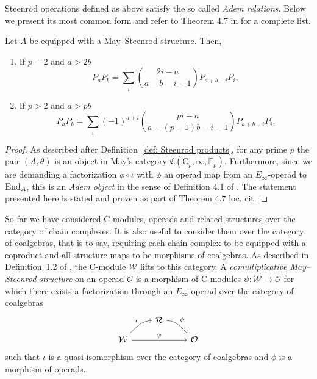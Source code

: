Steenrod operations defined as above satisfy the so called \textit{Adem relations}.
Below we present its most common form and refer to Theorem 4.7 in \cite{may70generalapproach} for a complete list.

\begin{lemma}
	Let $A$ be equipped with a May--Steenrod structure.
	Then,
	\begin{enumerate}
		\item If $p = 2$ and $a > 2b$
		\begin{equation*}
		P_{a}P_{b} = \sum_i {2i-a \choose a-b-i-1} P_{a+b-i}P_i,
		\end{equation*}
		\item If $p > 2$ and $a > pb$
		\begin{equation*}
		P_{a}P_{b} = \sum_i (-1)^{a+i}{pi-a \choose a-(p-1)b-i-1} P_{a+b-i}P_i.
		\end{equation*}
	\end{enumerate}		
\end{lemma}

\begin{proof}
	As described after Definition~\ref{def: Steenrod products}, for any prime $p$ the pair $(A, \theta)$ is an object in May's category $\mathfrak{C}(\mathrm C_p, \infty, \mathbb{F}_p)$.
	Furthermore, since we are demanding a factorization $\phi \circ \iota$ with $\phi$ an operad map from an $E_\infty$-operad to $\mathrm{End}_A$, this is an \textit{Adem object} in the sense of Definition 4.1 of \cite{may70generalapproach}.
	The statement presented here is stated and proven as part of Theorem 4.7 loc. cit.
\end{proof}

So far we have considered $\mathrm{C}$-modules, operads and related structures over the category of chain complexes.
It is also useful to consider them over the category of coalgebras, that is to say, requiring each chain complex to be equipped with a coproduct and all structure maps to be morphisms of coalgebras.	
As described in Definition~1.2 of \cite{may70generalapproach}, the $\mathrm{C}$-module $\mathcal W$ lifts to this category.
A \textit{comultiplicative May--Steenrod structure} on an operad $\mathcal O$ is a morphism of $\mathrm{C}$-modules $\psi \colon \mathcal W \to \mathcal O$ for which there exists a factorization through an $E_\infty$-operad over the category of coalgebras
\begin{equation*}
\begin{tikzcd}[column sep = normal, row sep = small]
& \mathcal R \arrow[dr, "\phi", out=0] & \\
\mathcal W \arrow[ur, "\iota", in=180] \arrow[rr, "\psi"] & & \mathcal O
\end{tikzcd}
\end{equation*}
such that $\iota$ is a quasi-isomorphism over the category of coalgebras and $\phi$ is a morphism of operads.

